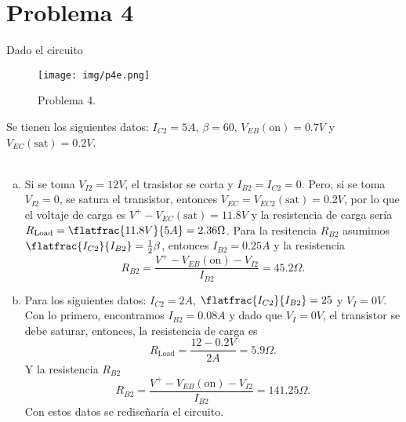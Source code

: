 \documentclass[conference]{IEEEtran}
\begin{document}
\section{Problema 4}
Dado el circuito
\begin{figure}[H]
	\centering
	\texttt{[image: img/p4e.png]}
	\caption{Problema 4.}
	\label{p2e}
\end{figure}
Se tienen los siguientes datos: $I_{C2} = 5A$, $\beta = 60$, $V_{EB} (\text{on}) = 0.7V$ y $V_{EC} (\text{sat}) = 0.2V$. \\\\

\begin{enumerate}[a)]
	\item Si se toma $V_{I2} = 12V$, el trasistor se corta y $I_{B2} = I_{C2} = 0$. Pero, si se toma $V_{I2} = 0$, se satura el transistor, entonces $V_{EC} = V_{EC2} (\text{sat}) = 0.2V$, por lo que el voltaje de carga es $V^+ - V_{EC}(\text{sat}) = 11.8V$ y la resistencia de carga sería $R_{\text{Load}} = \flatfrac{11.8V}{5A} = 2.36\Omega$. Para la resitencia $R_{B2}$ asumimos $\flatfrac{I_{C2}}{I_{B2}} = \frac{1}{2} \beta$, entonces $I_{B2} = 0.25A$ y la resistencia
	$$ R_{B2} = \frac{V^+ - V_{EB} (\text{on}) - V_{I2}}{I_{B2}} = \boxed{45.2\Omega .} $$
	\item Para los siguientes datos: $I_{C2} = 2A$, $\flatfrac{I_{C2}}{I_{B2}} = 25$ y $V_I = 0V$. Con lo primero, encontramos $I_{B2} = 0.08A$ y dado que $V_I = 0V$, el transistor se debe saturar, entonces, la resistencia de carga es 
		$$ R_{\text{Load}} = \frac{12 - 0.2V}{2A} = 5.9\Omega .$$
	Y la resistencia $R_{B2}$
		$$ R_{B2} = \frac{V^+ - V_{EB} (\text{on}) - V_{I2}}{I_{B2}} = 141.25\Omega . $$
	Con estos datos se rediseñaría el circuito.
\end{enumerate}
\end{document}
